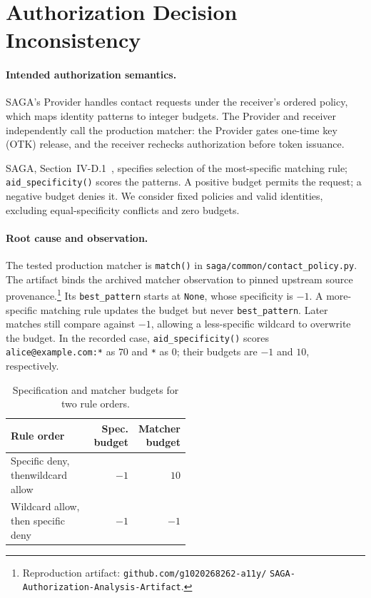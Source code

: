 \section{Authorization Decision Inconsistency}
\label{sec:authorization-inconsistency}

\paragraph{Intended authorization semantics.}
SAGA's Provider handles contact requests under the receiver's ordered policy,
which maps identity patterns to integer budgets. The Provider and receiver
independently call the production matcher: the Provider gates one-time key
(OTK) release, and the receiver rechecks authorization before token issuance.

SAGA, Section~IV-D.1~\cite{syros2025saga}, specifies selection of the
most-specific matching rule; \texttt{aid\_specificity()} scores the patterns.
A positive budget permits the request; a negative budget denies it.
We consider fixed policies and valid identities, excluding equal-specificity
conflicts and zero budgets.

\paragraph{Root cause and observation.}
The tested production matcher is \texttt{match()} in
\texttt{saga/common/\allowbreak contact\_policy.py}. The artifact binds the
archived matcher observation to pinned upstream source provenance.\footnote{\raggedright Reproduction artifact:
\texttt{github.com/g1020268262-a11y/}\linebreak
\texttt{SAGA-Authorization-Analysis-Artifact}.}
Its \texttt{best\_pattern} starts at \texttt{None}, whose specificity is $-1$.
A more-specific matching rule updates the budget but never
\texttt{best\_pattern}. Later matches still compare against $-1$, allowing
a less-specific wildcard to overwrite the budget.
In the recorded case, \texttt{aid\_specificity()} scores
\texttt{alice@example.com:*} as $70$
and \texttt{*} as $0$; their budgets are $-1$ and $10$, respectively.

\begin{table}[htbp]
\caption{Specification and matcher budgets for two rule orders.}
\label{tab:matcher-evaluation}
\centering
\small
\begin{tabular}{@{}p{0.50\linewidth}rr@{}}
\hline
Rule order & \shortstack{Spec.\\budget} & \shortstack{Matcher\\budget} \\
\hline
Specific deny, then\newline wildcard allow & $-1$ & $10$ \\
Wildcard allow, then specific deny & $-1$ & $-1$ \\
\hline
\end{tabular}
\end{table}

